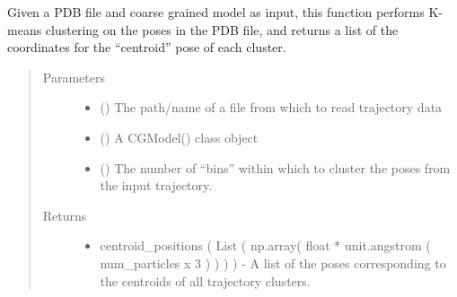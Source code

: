 \documentclass[letterpaper,12pt,english,openany,oneside]{sphinxmanual}
\begin{document}
\begin{fulllineitems}
\label{\detokenize{ensembles:ensembles.cluster.get_cluster_centroid_positions}}
Given a PDB file and coarse grained model as input, this function performs K-means clustering on the poses in the PDB file, and returns a list of the coordinates for the “centroid” pose of each cluster.
\begin{quote}\begin{description}
\item[{Parameters}] \leavevmode\begin{itemize}
\item {} 
 () \textendash{} The path/name of a file from which to read trajectory data

\item {} 
 () \textendash{} A CGModel() class object

\item {} 
 () \textendash{} The number of “bins” within which to cluster the poses from the input trajectory.

\end{itemize}

\item[{Returns}] \leavevmode
\begin{itemize}
\item {} 
centroid\_positions ( List ( np.array( float * unit.angstrom ( num\_particles x 3 ) ) ) ) - A list of the poses corresponding to the centroids of all trajectory clusters.

\end{itemize}


\end{description}\end{quote}

\end{fulllineitems}


\newpage
\end{document}
